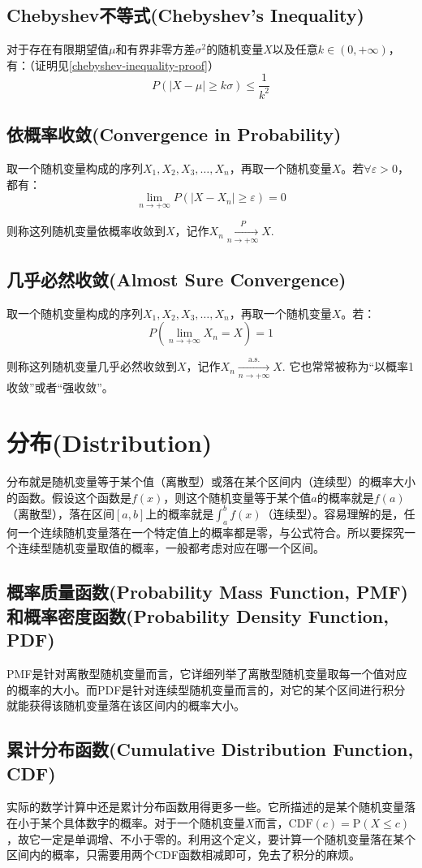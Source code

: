 \documentclass[UTF8]{ctexbook}
\begin{document}
\section{Chebyshev不等式(Chebyshev's Inequality)}
\label{chebyshev-inequality}
对于存在有限期望值$\mu$和有界非零方差$\sigma^2$的随机变量$X$以及任意$k\in(0,+\infty)$，有：（证明见\ref{chebyshev-inequality-proof}）
\[
	P(|X-\mu|\geq k\sigma)\leq\frac{1}{k^2}
\]
\section{依概率收敛(Convergence in Probability)}
\label{convg-in-prob}
取一个随机变量构成的序列$X_1,X_2,X_3,\dots,X_n$，再取一个随机变量$X$。若$\forall\varepsilon>0$，都有：
\[
	\lim_{n\to+\infty}P(|X-X_n|\geq\varepsilon)=0
\]

则称这列随机变量依概率收敛到$X$，记作$X_n\xrightarrow[n\to+\infty]{P}X$.
\section{几乎必然收敛(Almost Sure Convergence)}
取一个随机变量构成的序列$X_1,X_2,X_3,\dots,X_n$，再取一个随机变量$X$。若：
\[
	P(\lim_{n\to+\infty}X_n=X)=1
\]

则称这列随机变量几乎必然收敛到$X$，记作$X_n\xrightarrow[n\to+\infty]{\mathrm{a.s.}}X$. 它也常常被称为“以概率1收敛”或者“强收敛”。
\chapter{分布(Distribution)}
分布就是随机变量等于某个值（离散型）或落在某个区间内（连续型）的概率大小的函数。假设这个函数是$f(x)$，则这个随机变量等于某个值$a$的概率就是$f(a)$（离散型），落在区间$[a,b]$上的概率就是$\int_a^bf(x)$（连续型）。容易理解的是，任何一个连续随机变量落在一个特定值上的概率都是零，与公式符合。所以要探究一个连续型随机变量取值的概率，一般都考虑对应在哪一个区间。
\section{概率质量函数(Probability Mass Function, PMF)和概率密度函数(Probability Density Function, PDF)}
\label{pmf-pdf}
PMF是针对离散型随机变量而言，它详细列举了离散型随机变量取每一个值对应的概率的大小。而PDF是针对连续型随机变量而言的，对它的某个区间进行积分就能获得该随机变量落在该区间内的概率大小。
\section{累计分布函数(Cumulative Distribution Function, CDF)}
\label{cdf}
实际的数学计算中还是累计分布函数用得更多一些。它所描述的是某个随机变量落在小于某个具体数字的概率。对于一个随机变量$X$而言，$\mathrm{CDF}(c)=\mathrm{P}(X\leq c)$，故它一定是单调增、不小于零的。利用这个定义，要计算一个随机变量落在某个区间内的概率，只需要用两个CDF函数相减即可，免去了积分的麻烦。
\end{document}

